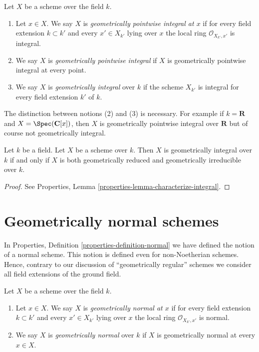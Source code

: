 \begin{definition}
\label{definition-geometrically-integral}
Let $X$ be a scheme over the field $k$.
\begin{enumerate}
\item Let $x \in X$. We say $X$ is
{\it geometrically pointwise integral at $x$} if for every
field extension $k \subset k'$ and every $x' \in X_{k'}$ lying over $x$
the local ring $\mathcal{O}_{X_{k'}, x'}$ is integral.
\item We say $X$ is {\it geometrically pointwise integral} if $X$
is geometrically pointwise integral at every point.
\item We say $X$ is {\it geometrically integral} over $k$ if the scheme
$X_{k'}$ is integral for every field extension $k'$ of $k$.
\end{enumerate}
\end{definition}

\noindent
The distinction between notions (2) and (3) is necessary.
For example if $k = \mathbf{R}$ and $X = \Spec(\mathbf{C}[x])$,
then $X$ is geometrically pointwise integral over $\mathbf{R}$ but
of course not geometrically integral.

\begin{lemma}
\label{lemma-geometrically-integral}
Let $k$ be a field.
Let $X$ be a scheme over $k$.
Then $X$ is geometrically integral over $k$ if and only if
$X$ is both geometrically reduced and geometrically irreducible
over $k$.
\end{lemma}

\begin{proof}
See Properties, Lemma \ref{properties-lemma-characterize-integral}.
\end{proof}





\section{Geometrically normal schemes}
\label{section-geometrically-normal}

\noindent
In Properties, Definition \ref{properties-definition-normal}
we have defined the notion of a normal scheme.
This notion is defined even for non-Noetherian
schemes. Hence, contrary to our discussion of
``geometrically regular'' schemes we consider all
field extensions of the ground field.

\begin{definition}
\label{definition-geometrically-normal}
Let $X$ be a scheme over the field $k$.
\begin{enumerate}
\item Let $x \in X$. We say $X$ is
{\it geometrically normal at $x$} if for every
field extension $k \subset k'$ and every $x' \in X_{k'}$ lying over $x$
the local ring $\mathcal{O}_{X_{k'}, x'}$ is normal.
\item We say $X$ is {\it geometrically normal} over $k$ if $X$
is geometrically normal at every $x \in X$.
\end{enumerate}
\end{definition}

